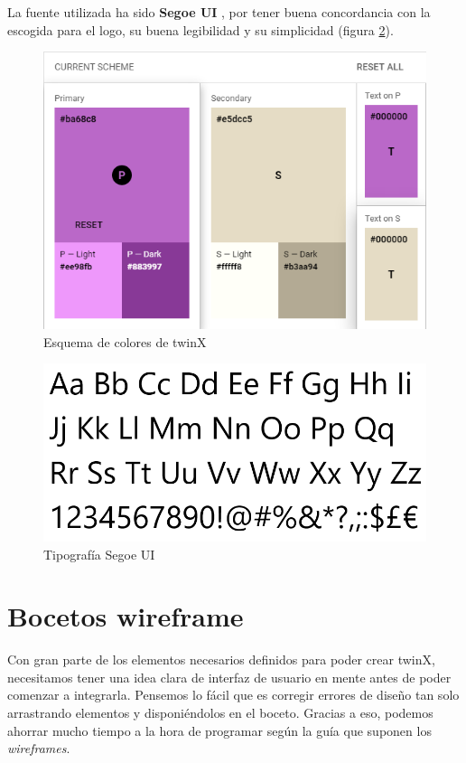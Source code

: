 La fuente utilizada ha sido \textbf{Segoe UI} \cite{segoeui}, por tener buena concordancia con la escogida para el logo, su buena legibilidad y su simplicidad (figura \ref{fig:segoeui}).

\begin{figure}
	\centering
	\includegraphics{img/esquema_colores}
	\caption{Esquema de colores de twinX}
	\label{fig:esquemacolores}
\end{figure}

\begin{figure}
	\centering
	\includegraphics{img/segoeui}
	\caption{Tipografía Segoe UI}
	\label{fig:segoeui}
\end{figure}


\section{Bocetos wireframe}
\label{sec:bocetos}

Con gran parte de los elementos necesarios definidos para poder crear twinX, necesitamos tener una idea clara de interfaz de usuario en mente antes de poder comenzar a integrarla. Pensemos lo fácil que es corregir errores de diseño tan solo arrastrando elementos y disponiéndolos en el boceto. Gracias a eso, podemos ahorrar mucho tiempo a la hora de programar según la guía que suponen los \textit{wireframes}.

